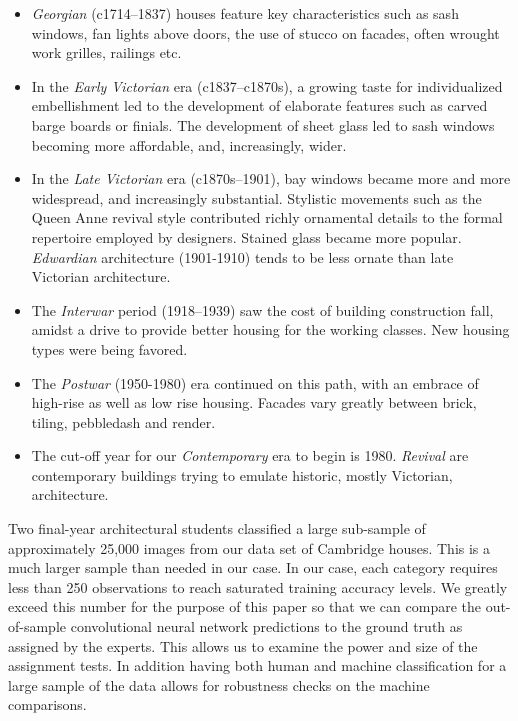 \documentclass[]{article}
\begin{document}
\begin{itemize}
\item
  \emph{Georgian} (c1714--1837) houses feature key characteristics such
  as sash windows, fan lights above doors, the use of stucco on facades,
  often wrought work grilles, railings etc.\label{def_eras}
\item
  In the \emph{Early Victorian} era (c1837--c1870s), a growing taste for
  individualized embellishment led to the development of elaborate
  features such as carved barge boards or finials. The development of
  sheet glass led to sash windows becoming more affordable, and,
  increasingly, wider.
\item
  In the \emph{Late Victorian} era (c1870s--1901), bay windows became
  more and more widespread, and increasingly substantial. Stylistic
  movements such as the Queen Anne revival style contributed richly
  ornamental details to the formal repertoire employed by designers.
  Stained glass became more popular. \emph{Edwardian} architecture
  (1901-1910) tends to be less ornate than late Victorian architecture.
\item
  The \emph{Interwar} period (1918--1939) saw the cost of building
  construction fall, amidst a drive to provide better housing for the
  working classes. New housing types were being favored.
\item
  The \emph{Postwar} (1950-1980) era continued on this path, with an
  embrace of high-rise as well as low rise housing. Facades vary greatly
  between brick, tiling, pebbledash and render.
\item
  The cut-off year for our \emph{Contemporary} era to begin is 1980.
  \emph{Revival} are contemporary buildings trying to emulate historic,
  mostly Victorian, architecture.
\end{itemize}

Two final-year architectural students classified a large sub-sample of
approximately 25,000 images from our data set of Cambridge houses. This
is a much larger sample than needed in our case. In our case, each
category requires less than 250 observations to reach saturated training
accuracy levels. We greatly exceed this number for the purpose of this
paper so that we can compare the out-of-sample convolutional neural
network predictions to the ground truth as assigned by the experts. This
allows us to examine the power and size of the assignment tests. In
addition having both human and machine classification for a large sample
of the data allows for robustness checks on the machine comparisons.
\end{document}
